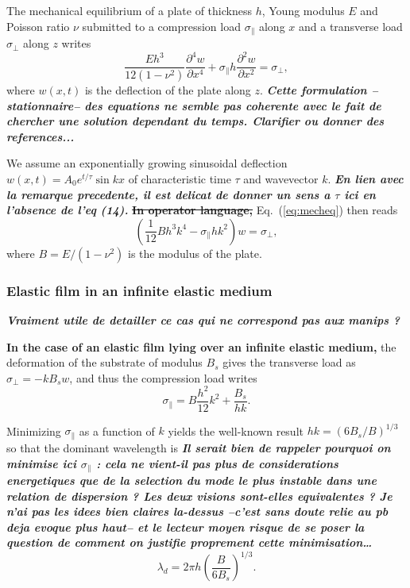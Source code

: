 \documentclass[twocolumn,superscriptaddress,showpacs,preprintnumbers,
amsmath,amssymb,prl]{revtex4-1}
\newcommand{\seb}[1]{\textbf{\color{blue}#1}} %
\newcommand{\sseb}[1]{\sout{\textbf{\color{blue}#1}}} %
\begin{document}
The mechanical equilibrium of a plate of thickness $h$, Young modulus $E$ and Poisson ratio $\nu$ submitted to a compression load $\sigma_\parallel$ along $x$ and a transverse load $\sigma_\perp$ along $z$ writes
\begin{equation}
\frac{E h^3}{12(1-\nu^2)}\frac{\partial^4 w}{\partial x^4} + \sigma_\parallel h \frac{\partial^2 w}{\partial x^2} = \sigma_\perp,
\label{eq:mecheq}
\end{equation}
where $w(x,t)$ is the deflection of the plate along $z$. \seb{\it Cette formulation --stationnaire-- des equations ne semble pas coherente avec le fait de chercher une solution dependant du temps. Clarifier ou donner des references...}

We assume an exponentially growing sinusoidal deflection $w(x,t) =  A_0 e^{t/\tau} \sin kx$ of characteristic time $\tau$ and wavevector $k$. \seb{\it En lien avec la remarque precedente, il est delicat de donner un sens a $\tau$ ici en l'absence de l'eq (14).} \sseb{In operator language,} Eq.~(\ref{eq:mecheq}) then reads
\begin{equation}
\left(\frac{1}{12} B h^3 k^4 - \sigma_\parallel h k^2\right)w = \sigma_\perp,
\label{eq:mecheqop}
\end{equation}
where $B=E/(1-\nu^2)$ is the modulus of the plate.

\subsubsection*{Elastic film in an infinite elastic medium}

\seb{\it Vraiment utile de detailler ce cas qui ne correspond pas aux manips ?}

\seb{In the case of an elastic film lying over an infinite elastic medium,} the deformation of the substrate of modulus $B_s$ gives the transverse load as $\sigma_\perp = -k B_s w$, and thus the compression load writes
\begin{equation}
\sigma_\parallel = B \frac{h^2}{12} k^2 + \frac{B_s}{hk}.
\label{eq:sigma0}
\end{equation}

Minimizing $\sigma_\parallel$ as a function of $k$ yields the well-known result $hk = \left(6B_s/B\right)^{1/3}$ \cite{Biot1957,Cerda2003} so that the dominant wavelength is \seb{\it Il serait bien de rappeler pourquoi on minimise ici $\sigma_\parallel$ : cela ne vient-il pas plus de considerations energetiques que de la selection du mode le plus instable dans une relation de dispersion ? Les deux visions sont-elles equivalentes ? Je n'ai pas les idees bien claires la-dessus --c'est sans doute relie au pb deja evoque plus haut-- et le lecteur moyen risque de se poser la question de comment on justifie proprement cette minimisation\dots}
\begin{equation}
\lambda_d = 2\pi h \left(\frac{B}{6B_s}\right)^{1/3}.
\label{eq:lambdaElEl}
\end{equation}
\end{document}
